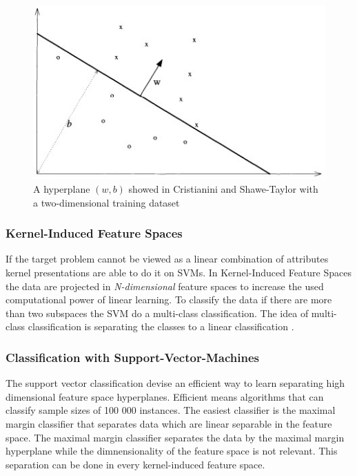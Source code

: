 \begin{figure}[ht!]
  \centering
  \includegraphics[width=12cm]{pictures/hyperplane.jpg}
  \caption{A hyperplane $(w, b)$ showed in Cristianini and Shawe-Taylor \cite{cristianini_shawe-taylor_2000} with a two-dimensional training dataset}
  \label{fig:hyperplane}
\end{figure}

\subsubsection*{Kernel-Induced Feature Spaces}

If the target problem cannot be viewed as a linear combination of attributes kernel presentations are able to do it on SVMs. In Kernel-Induced Feature Spaces the data are projected in
\textit{N-dimensional} feature spaces to increase the used computational power of linear learning. To classify the data if there are more than two subspaces the SVM do a multi-class
classification. The idea of multi-class classification is separating the classes to a linear classification \cite{tzotsos2008support}.

\subsubsection*{Classification with Support-Vector-Machines}

The support vector classification devise an efficient way to learn separating high dimensional feature space hyperplanes. Efficient means algorithms that can classify sample sizes of 100
000 instances. The easiest classifier is the maximal margin classifier that separates data which are linear separable in the feature space. The maximal margin classifier separates the
data by the maximal margin hyperplane while the dimnensionality of the feature space is not relevant. This separation can be done in every kernel-induced feature space.
\cite{cristianini_shawe-taylor_2000}  \\

